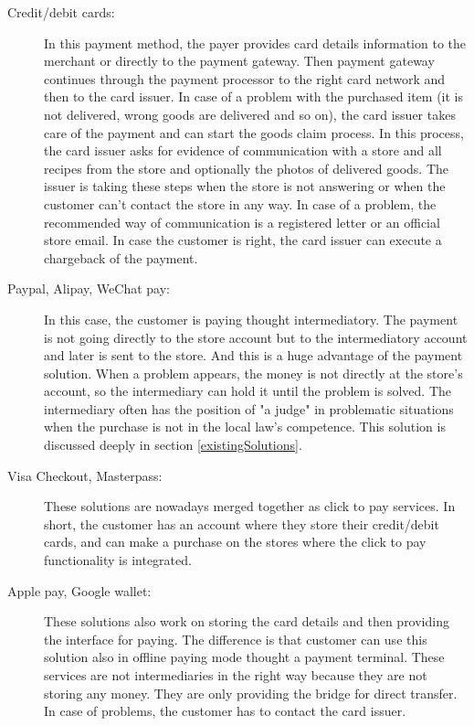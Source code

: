 \documentclass[thesis=M,english]{FITthesis}[2019/12/23]
\begin{document}
\begin{description}

\item[Credit/debit cards:]
In this payment method, the payer provides card details information to the merchant or directly to the payment gateway. Then payment gateway continues through the payment processor to the right card network and then to the card issuer.
In case of a problem with the purchased item (it is not delivered, wrong goods are delivered and so on), the card issuer takes care of the payment and can start the goods claim process. In this process, the card issuer asks for evidence of communication with a store and all recipes from the store and optionally the photos of delivered goods. The issuer is taking these steps when the store is not answering or when the customer can't contact the store in any way. In case of a problem, the recommended way of communication is a registered letter or an official store email. In case the customer is right, the card issuer can execute a chargeback of the payment. \cite{creditCardInfo} \cite{tatraBank}

\item[Paypal, Alipay, WeChat pay:]

In this case, the customer is paying thought intermediatory. The payment is not going directly to the store account but to the intermediatory account and later is sent to the store. And this is a huge advantage of the payment solution. When a problem appears, the money is not directly at the store's account, so the intermediary can hold it until the problem is solved. The intermediary often has the position of "a judge" in problematic situations when the purchase is not in the local law's competence. This solution is discussed deeply in section \ref{existingSolutions}.

\item[Visa Checkout, Masterpass:]
These solutions are nowadays merged together as click to pay services. In short, the customer has an account where they store their credit/debit cards, and can make a purchase on the stores where the click to pay functionality is integrated. \cite{clickToPay}


\item[Apple pay, Google wallet:]
These solutions also work on storing the card details and then providing the interface for paying. The difference is that customer can use this solution also in offline paying mode thought a payment terminal. These services are not intermediaries in the right way because they are not storing any money. They are only providing the bridge for direct transfer. In case of problems, the customer has to contact the card issuer.


\end{description}
\end{document}
